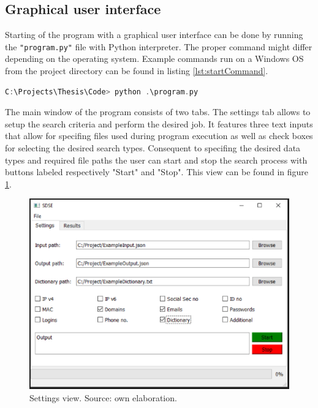 \documentclass[a4paper,twoside,12pt]{book}
\begin{document}
\subsection{Graphical user interface}

Starting of the program with a graphical user interface can be done by running the \lstinline|"program.py"| file with Python interpreter. The proper command
might differ depending on the operating system. Example commands run on a Windows OS from the project directory
can be found in listing \ref{lst:startCommand}.

\begin{lstlisting}[float=!ht,language=C++,label=lst:startCommand,caption={Command for starting the program.},frame=lines,framexleftmargin=0.5em,captionpos=b,escapechar=^,texcl=true,breaklines=true]
C:\Projects\Thesis\Code> python .\program.py
\end{lstlisting}


The main window of the program consists of two tabs. The settings tab allows to setup the search criteria and perform
the desired job. It features three text inputs that allow for specifing files used during program execution as well as 
check boxes for selecting the desired search types. Consequent to specifing the desired data types and required file paths the user can start and stop the search process
with buttons labeled respectively "Start" and "Stop". This view can be found in figure \ref{fig:SettingsTab}.

\begin{figure}
\centering
\includegraphics{Images/SettingsTab}
\caption{Settings view. Source: own elaboration.}
\label{fig:SettingsTab}
\end{figure}
\end{document}
